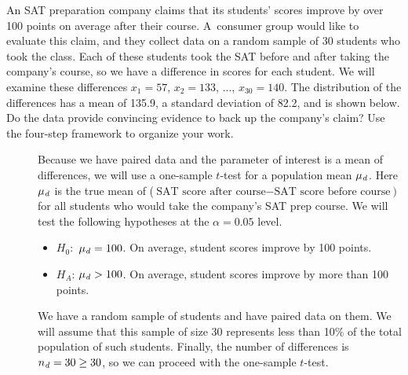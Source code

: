 \begin{examplewrap}
\begin{nexample}{An SAT preparation company claims that its students' scores
    improve by over 100 points on average after their course.
    A~consumer group would like to evaluate this claim, and they collect data
    on a random sample of 30 students who took the class.
    Each of these students took the SAT before and after taking the company's
    course, so we have a difference in scores for each student.
    We will examine these differences $x_1=57$, $x_2=133$, ..., $x_{30}=140$.
    The distribution of the differences has a mean of 135.9, a standard
    deviation of 82.2, and is shown below.
    Do the data provide convincing evidence to back up the company's claim?
    Use the four-step framework to organize your work.
    \begin{center}
    \end{center}}\label{sat_prep_company_intro_example}
\begin{description}
\item[] Because we have paired data and the parameter of interest is a mean of differences, we will use a one-sample $t$-test for a population mean $\mu_{\text{\emph{d}}}$.  Here $\mu_{\text{\emph{d}}}$ is the true mean of (${\text{SAT score after course} - \text{SAT score before course}})$ for all students who would take the company's SAT prep course.  We will test the following hypotheses at the $\alpha=0.05$ level.\vspace{-1mm}
\begin{itemize}
\setlength{\itemsep}{0mm}
\item[]  $H_0$: \,$\mu_{\text{\emph{d}}} = 100$.  On average, student scores improve by 100 points.   
\item[] $H_A$: $\mu_{\text{\emph{d}}} > 100$.  On average, student scores improve by more than 100 points.
\end{itemize}

\item[] We have a random sample of students and have paired data on them.  We will assume that this sample of size 30 represents less than 10\% of the total population of such students.  Finally, the number of differences is $n_{\text{\emph{d}}}=30\ge 30$, so we can proceed with the one-sample $t$-test.  
 

\end{description}
\end{nexample}
\end{examplewrap}
